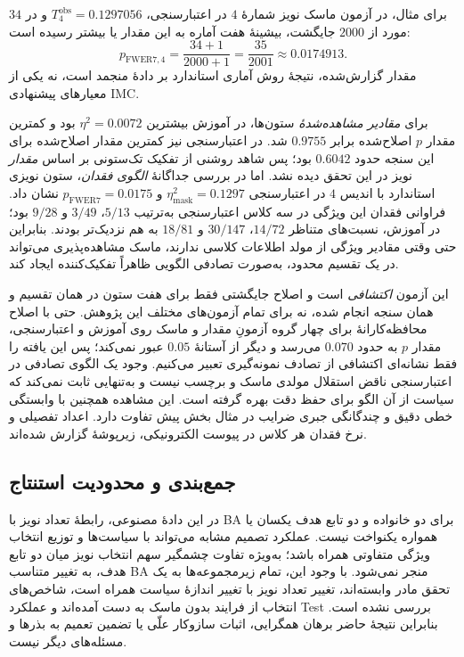 برای مثال،
در آزمون ماسک
نویز شمارهٔ $4$
در اعتبارسنجی،
$T_4^{\mathrm{obs}}=0.1297056$
و در $34$ مورد
از $2000$ جایگشت،
بیشینهٔ هفت آماره
به این مقدار یا
بیشتر رسیده است:
\begin{equation}
\label{eq:ch4-e14-p-fwer7-example}
p_{\mathrm{FWER7},4}
=\frac{34+1}{2000+1}
=\frac{35}{2001}
\approx0.0174913.
\end{equation}
مقدار گزارش‌شده،
نتیجهٔ روش آماری
استاندارد بر دادهٔ
منجمد است،
نه یکی از
معیارهای پیشنهادی IMC.

برای \emph{مقادیر مشاهده‌شدهٔ}
ستون‌ها، در آموزش
بیشترین $\eta^2=0.0072$
بود و کمترین مقدار
$p$ اصلاح‌شده برابر
$0.9755$ شد.
در اعتبارسنجی نیز
کمترین مقدار اصلاح‌شده
برای این سنجه حدود
$0.6042$ بود؛
پس شاهد روشنی از
تفکیک تک‌ستونی
بر اساس \emph{مقدار}
نویز در این تحقق دیده نشد.
اما در بررسی جداگانهٔ
\emph{الگوی فقدان}،
ستون نویزی استاندارد
با اندیس $4$ در
اعتبارسنجی
$\eta^2_{\mathrm{mask}}=0.1297$
و $p_{\mathrm{FWER7}}=0.0175$
نشان داد.
فراوانی فقدان
این ویژگی در سه کلاس
اعتبارسنجی به‌ترتیب
$5/13$، $3/49$ و
$9/28$ بود؛
در آموزش، نسبت‌های
متناظر $14/72$،
$30/147$ و $18/81$
به هم نزدیک‌تر بودند.
بنابراین حتی وقتی
مقادیر ویژگی از مولد
اطلاعات کلاسی ندارند،
ماسک مشاهده‌پذیری
می‌تواند در یک تقسیم
محدود، به‌صورت تصادفی
الگویی ظاهراً
تفکیک‌کننده ایجاد کند.

این آزمون \emph{اکتشافی}
است و اصلاح جایگشتی
فقط برای هفت ستون
در همان تقسیم و
همان سنجه انجام شده،
نه برای تمام آزمون‌های
مختلف این پژوهش.
حتی با اصلاح محافظه‌کارانهٔ
 برای چهار
گروه آزمونِ مقدار و ماسک
روی آموزش و اعتبارسنجی،
مقدار $p$ به حدود $0.070$
می‌رسد و دیگر از آستانهٔ
$0.05$ عبور نمی‌کند؛
پس این یافته را فقط
نشانه‌ای اکتشافی
از تصادف نمونه‌گیری
تعبیر می‌کنیم.
وجود یک الگوی تصادفی
در اعتبارسنجی
ناقض استقلال مولدی
ماسک و برچسب نیست
و به‌تنهایی ثابت نمی‌کند
که سیاست از آن الگو
برای حفظ دقت بهره گرفته است.
این مشاهده همچنین
با وابستگی خطی دقیق
و چندگانگی جبری
ضرایب در مثال بخش پیش
تفاوت دارد.
اعداد تفصیلی و
نرخ فقدان هر کلاس
در پیوست الکترونیکی،
زیرپوشهٔ
گزارش شده‌اند.

\subsection{جمع‌بندی و محدودیت استنتاج}
\label{subsec:ch4-e14-limitations}

در این دادهٔ مصنوعی،
رابطهٔ تعداد نویز با BA
برای دو خانواده و دو تابع هدف
یکسان یا همواره یکنواخت نیست.
عملکرد تصمیم مشابه
می‌تواند با سیاست‌ها و
توزیع انتخاب ویژگی متفاوتی
همراه باشد؛
به‌ویژه تفاوت چشمگیر
سهم انتخاب نویز میان
دو تابع هدف، به تغییر
متناسب BA منجر نمی‌شود.
با وجود این،
تمام زیرمجموعه‌ها
به یک تحقق مادر وابسته‌اند،
تغییر تعداد نویز
با تغییر اندازهٔ سیاست
همراه است،
شاخص‌های انتخاب
از فرایند بدون ماسک
به دست آمده‌اند
و عملکرد Test بررسی نشده است.
بنابراین نتیجهٔ حاضر
برهان همگرایی،
اثبات سازوکار علّی
یا تضمین تعمیم
به بذرها و مسئله‌های دیگر نیست.


